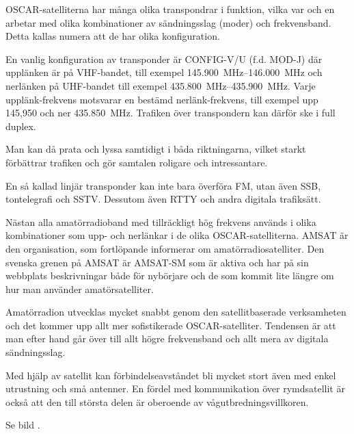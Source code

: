 OSCAR-satelliterna har många olika transpondrar i funktion, vilka var och en
arbetar med olika kombinationer av sändningsslag (moder) och frekvensband.
Detta kallas numera att de har olika konfiguration.

En vanlig konfiguration av transponder är CONFIG-V/U (f.d. MOD-J) där upplänken
är på VHF-bandet, till exempel \SIrange{145,900}{146,000}{\mega\hertz} och
nerlänken på UHF-bandet till exempel \SIrange{435,800}{435,900}{\mega\hertz}.
Varje upplänk-frekvens motsvarar en bestämd nerlänk-frekvens, till exempel upp
145,950 och ner \SI{435,850}{\mega\hertz}.
Trafiken över transpondern kan därför ske i full duplex.

Man kan då prata och lyssa samtidigt i båda riktningarna, vilket
starkt förbättrar trafiken och gör samtalen roligare och intressantare.

En så kallad linjär transponder kan inte bara överföra FM, utan även SSB,
tontelegrafi och SSTV.
Dessutom även RTTY och andra digitala trafiksätt.

Nästan alla amatörradioband med tillräckligt hög frekvens används i
olika kombinationer som upp- och nerlänkar i de olika OSCAR-satelliterna.
AMSAT är den organisation, som fortlöpande informerar om amatörradiosatelliter.
Den svenska grenen på AMSAT är AMSAT-SM som är aktiva och har på sin webbplats
beskrivningar både för nybörjare och de som kommit lite längre om hur man
använder amatörsatelliter.


Amatörradion utvecklas mycket snabbt genom den satellitbaserade
verksamheten och det kommer upp allt mer sofistikerade OSCAR-satelliter.
Tendensen är att man efter hand går över till allt
högre frekvensband och allt mera av digitala sändningsslag.

Med hjälp av satellit kan förbindelseavståndet bli mycket stort även
med enkel utrustning och små antenner.
En fördel med kommunikation över rymdsatellit är också att den till största
delen är oberoende av vågutbredningsvillkoren.

Se bild .
